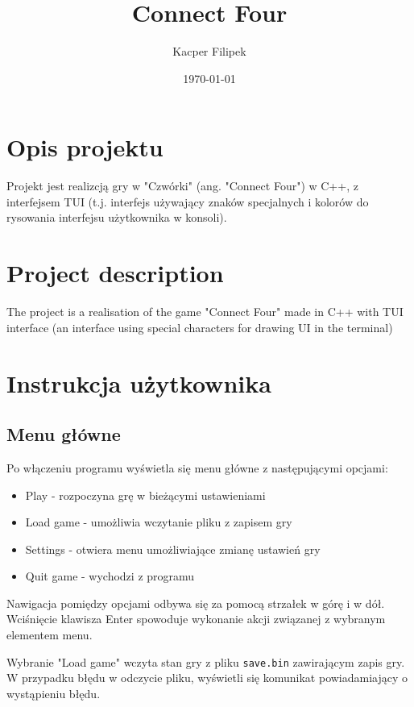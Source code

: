 \documentclass{article}
\title{Connect Four}
\author{Kacper Filipek}
\date{\today}
\begin{document}
\selectfont

\maketitle

\newpage

\section{Opis projektu}

Projekt jest realizcją gry w "Czwórki" (ang. "Connect Four") w C++, z interfejsem TUI (t.j. interfejs używający znaków 
specjalnych i kolorów do rysowania interfejsu użytkownika w konsoli). 

\section{Project description}

The project is a realisation of the game "Connect Four" made in C++ with TUI interface (an interface using special 
characters for drawing UI in the terminal)

\section{Instrukcja użytkownika}
\subsection*{Menu główne}

Po włączeniu programu wyświetla się menu główne z następującymi opcjami:
\begin{itemize}
    \item Play - rozpoczyna grę w bieżącymi ustawieniami
    \item Load game - umożliwia wczytanie pliku z zapisem gry
    \item Settings - otwiera menu umożliwiające zmianę ustawień gry
    \item Quit game - wychodzi z programu
\end{itemize}

Nawigacja pomiędzy opcjami odbywa się za pomocą strzałek w górę i w dół. Wciśnięcie klawisza Enter spowoduje wykonanie 
akcji związanej z wybranym elementem menu.

Wybranie "Load game" wczyta stan gry z pliku \texttt{save.bin} zawirającym zapis gry. 
W przypadku błędu w odczycie pliku, wyświetli się komunikat powiadamiający o wystąpieniu błędu.
\end{document}

